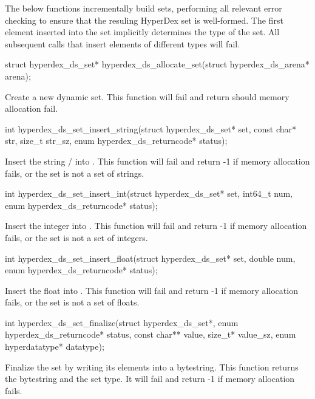 The below functions incrementally build sets, performing all relevant error
checking to ensure that the resuling HyperDex set is well-formed.  The first
element inserted into the set implicitly determines the type of the set.  All
subsequent calls that insert elements of different types will fail.

\begin{ccode}
struct hyperdex_ds_set* hyperdex_ds_allocate_set(struct hyperdex_ds_arena* arena);
\end{ccode}
\funcdesc Create a new dynamic set.  This function will fail and return
 should memory allocation fail.

\funcsep
\begin{ccode}
int hyperdex_ds_set_insert_string(struct hyperdex_ds_set* set,
                                  const char* str, size_t str_sz,
                                  enum hyperdex_ds_returncode* status);
\end{ccode}
\funcdesc Insert the string / into .  This
function will fail and return -1 if memory allocation fails, or the set is not a
set of strings.

\funcsep
\begin{ccode}
int hyperdex_ds_set_insert_int(struct hyperdex_ds_set* set, int64_t num,
                               enum hyperdex_ds_returncode* status);
\end{ccode}
\funcdesc Insert the integer  into .  This function will
fail and return -1 if memory allocation fails, or the set is not a set of
integers.

\funcsep
\begin{ccode}
int hyperdex_ds_set_insert_float(struct hyperdex_ds_set* set, double num,
                                 enum hyperdex_ds_returncode* status);
\end{ccode}
\funcdesc Insert the float  into .  This function will fail
and return -1 if memory allocation fails, or the set is not a set of floats.

\funcsep
\begin{ccode}
int hyperdex_ds_set_finalize(struct hyperdex_ds_set*,
                             enum hyperdex_ds_returncode* status,
                             const char** value, size_t* value_sz,
                             enum hyperdatatype* datatype);
\end{ccode}
\funcdesc Finalize the set by writing its elements into a bytestring.  This
function returns the bytestring and the set type.  It will fail and return -1 if
memory allocation fails.

